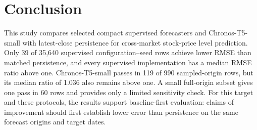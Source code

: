 \section{Conclusion}

This study compares selected compact supervised forecasters and Chronos-T5-small with latest-close persistence for cross-market stock-price level prediction. Only 39 of 35,640 supervised configuration--seed rows achieve lower RMSE than matched persistence, and every supervised implementation has a median RMSE ratio above one. Chronos-T5-small passes in 119 of 990 sampled-origin rows, but its median ratio of 1.036 also remains above one. A small full-origin subset gives one pass in 60 rows and provides only a limited sensitivity check. For this target and these protocols, the results support baseline-first evaluation: claims of improvement should first establish lower error than persistence on the same forecast origins and target dates.
